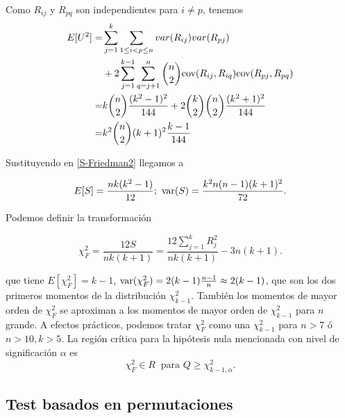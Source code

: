 	Como $R_{ij}$ y $R_{pq}$ son independientes para $i \neq p$, tenemos
	\begin{align*}
		E[U^2] =& \sum\limits_{j=1}^k
					\sum\limits_{1 \leq i < p \leq n}
						var(R_{ij})var(R_{pj}) \\
			 &+ 2 
			    \sum\limits_{j=1}^{k-1}
			      \sum\limits_{q=j+1}^n
			    {n \choose 2}
				\text{cov}(R_{ij}, R_{iq}) \text{cov}(R_{pj}, R_{pq}) \\
			=& k {n \choose 2} \frac{(k^2-1)^2}{144} +
				2{k \choose 2}{n \choose 2} 
					\frac{(k^2+1)^2}{144} \\
			=& k^2 {n \choose 2} (k+1)^2 \frac{k-1}{144}
	\end{align*}	
	
	Sustituyendo en \ref{S-Friedman2} llegamos a 
	
	\[ E[S] = \frac{nk(k^2-1)}{12}; \ 
		\var(S)= \frac{k^2n(n-1)(k+1)^2}{72} .\]
	
	Podemos definir la transformación
	
	\[ \chi^2_F = \frac{12S}{nk(k+1)} = 
	\frac{12 \sum\limits_{j=1}^k R_j^2}{nk(k+1)} -3n(k+1) .
	\]
	
	que tiene $E[\chi^2_F] = k-1$, $\text{var}(\chi^2_F)= 2(k-1)\frac{n-1}{n} \approx 2(k-1)$, que son los dos primeros momentos de la distribución $\chi^2_{k-1}$. También los momentos de mayor orden de $\chi^2_F$ se aproximan a los momentos de mayor orden de $\chi^2_{k-1}$ para $n$ grande. A efectos prácticos, podemos tratar $\chi^2_F$ como una $\chi^2_{k-1}$ para $n>7$ ó $n>10, k>5$. La región crítica para la hipótesis nula mencionada con nivel de significación $\alpha$ es
	\[ \chi^2_F \in R \ \text{ para } Q \geq \chi_{k-1,\alpha}^2 .\]
	
\subsection{Test basados en permutaciones}
	
